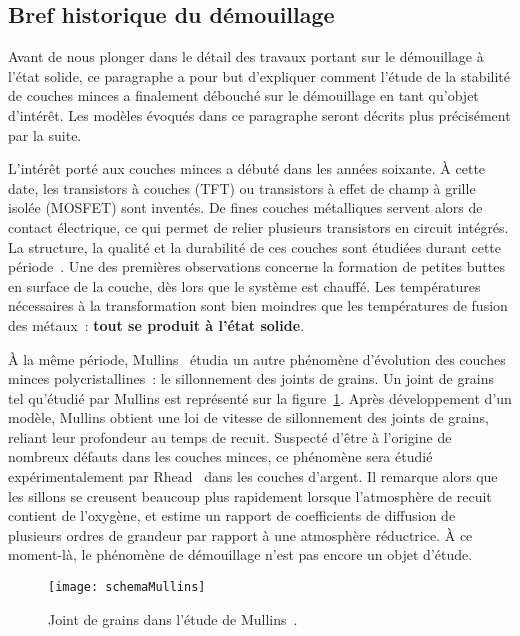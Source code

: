 	\subsection{Bref historique du démouillage}
\label{sHistoire}
Avant de nous plonger dans le détail des travaux portant sur le démouillage à l’état solide, ce paragraphe a pour but d'expliquer comment l'étude de la stabilité de couches minces a finalement débouché sur le démouillage en tant qu'objet d'intérêt. Les modèles évoqués dans ce paragraphe seront décrits plus précisément par la suite.\par 
L'intérêt porté aux couches minces a débuté dans les années soixante. À cette date, les transistors à couches (TFT) ou transistors à effet de champ à grille isolée (MOSFET) sont inventés. De fines couches métalliques servent alors de contact électrique, ce qui permet de relier plusieurs transistors en circuit intégrés. La structure, la qualité et la durabilité de ces couches sont étudiées durant cette période~\cite{pennebaker1969hillock,dheurle1968structure,caswell1963low}. Une des premières observations concerne la formation de petites buttes en surface de la couche, dès lors que le système est chauffé. Les températures nécessaires à la transformation sont bien moindres que les températures de fusion des métaux~:
\textbf{tout se produit à l'état solide}.\par 
À la même période, Mullins~\cite{mullins1957theory} étudia un autre phénomène d'évolution des couches minces polycristallines~: le sillonnement des joints de grains. Un joint de grains tel qu'étudié par Mullins est représenté sur la figure~\ref{schemaMullins}. Après développement d'un modèle, Mullins obtient une loi de vitesse de sillonnement des joints de grains, reliant leur profondeur au temps de recuit. Suspecté d'être à l'origine de nombreux défauts dans les couches minces, ce phénomène sera étudié expérimentalement par Rhead~\cite{rhead1963surface,rhead1965surface} dans les couches d'argent. Il remarque alors que les sillons se creusent beaucoup plus rapidement lorsque l'atmosphère de recuit contient de l'oxygène, et estime un rapport de coefficients de diffusion de plusieurs ordres de grandeur par rapport à une atmosphère réductrice. À ce moment-là, le phénomène de \og démouillage \fg{} n'est pas encore un objet d'étude.\par 
\begin{figure}[!htb]
	\centering
	\texttt{[image: schemaMullins]}
	\caption{Joint de grains dans l'étude de Mullins~\cite{mullins1957theory}.}
	\label{schemaMullins}
\end{figure}
